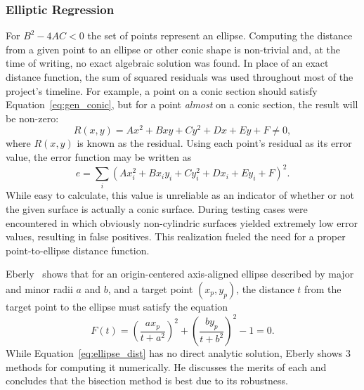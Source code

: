 \subsubsection{Elliptic Regression}\label{sec:elliptic_reg}
For $B^2 - 4AC < 0$ the set of points represent an ellipse.
Computing the distance from a given point to an ellipse or other conic shape is non-trivial and, at the time of writing, no exact algebraic solution was found.
In place of an exact distance function, the sum of squared residuals was used throughout most of the project's timeline.
For example, a point on a conic section should satisfy Equation~\eqref{eq:gen_conic}, but for a point \textit{almost} on a conic section, the result will be non-zero:
\begin{equation}
	R(x,y) = Ax^2 + Bxy + Cy^2 + Dx + Ey + F \neq 0,
\end{equation}
where $R(x,y)$ is known as the residual.
Using each point's residual as its error value, the error function may be written as
\begin{equation}\label{eq:sq_residual}
	e = \sum_i \left(Ax_i^2 + Bx_i y_i + Cy_i^2 + Dx_i + Ey_i + F\right)^2.
\end{equation}
While easy to calculate, this value is unreliable as an indicator of whether or not the given surface is actually a conic surface.
During testing cases were encountered in which obviously non-cylindric surfaces yielded extremely low error values, resulting in false positives.
This realization fueled the need for a proper point-to-ellipse distance function.

Eberly~\cite{GeoTools_pt_to_ellipse} shows that for an origin-centered axis-aligned ellipse described by major and minor radii $a$ and $b$, and a target point $(x_p, y_p)$, the distance $t$ from the target point to the ellipse must satisfy the equation
\begin{equation}\label{eq:ellipse_dist}
	F(t) = \left(\frac{a x_p}{t + a^2}\right)^2 + \left(\frac{b y_p}{t + b^2}\right)^2 - 1 = 0.
\end{equation}
While Equation~\eqref{eq:ellipse_dist} has no direct analytic solution, Eberly shows 3 methods for computing it numerically.
He discusses the merits of each and concludes that the bisection method is best due to its robustness.
\vspace{1cm}

